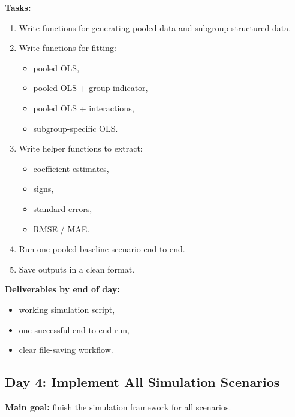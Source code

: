 \documentclass[11pt]{article}
\begin{document}
\textbf{Tasks:}
\begin{enumerate}[label=(\arabic*)]
    \item Write functions for generating pooled data and subgroup-structured data.
    \item Write functions for fitting:
    \begin{itemize}
        \item pooled OLS,
        \item pooled OLS + group indicator,
        \item pooled OLS + interactions,
        \item subgroup-specific OLS.
    \end{itemize}
    \item Write helper functions to extract:
    \begin{itemize}
        \item coefficient estimates,
        \item signs,
        \item standard errors,
        \item RMSE / MAE.
    \end{itemize}
    \item Run one pooled-baseline scenario end-to-end.
    \item Save outputs in a clean format.
\end{enumerate}

\textbf{Deliverables by end of day:}
\begin{itemize}
    \item working simulation script,
    \item one successful end-to-end run,
    \item clear file-saving workflow.
\end{itemize}

\subsection*{Day 4: Implement All Simulation Scenarios}
\textbf{Main goal:} finish the simulation framework for all scenarios.
\end{document}
